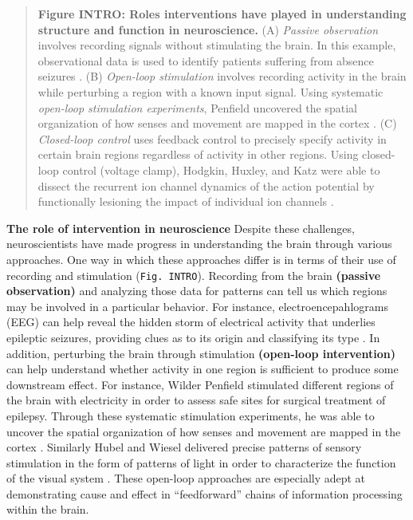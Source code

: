 \documentclass{article}
\begin{document}
\begin{quote}
\textbf{Figure INTRO: Roles interventions have played in understanding structure and function in neuroscience.} (A) \emph{Passive observation}
involves recording signals without stimulating the brain. In this example, observational data is used to identify patients suffering from absence seizures \autocite{smith2005eeg}. (B) \emph{Open-loop stimulation} involves recording activity in the brain while perturbing a region with a known input signal. Using systematic \emph{open-loop stimulation experiments}, Penfield uncovered the spatial organization of how senses and movement are mapped in the cortex
\autocite{penfield1937somatic,penfield1950cerebral}. (C)
\emph{Closed-loop control} uses feedback control to precisely specify activity in certain brain regions regardless of activity in other regions. Using closed-loop control (voltage clamp), Hodgkin, Huxley, and Katz were able to dissect the recurrent ion channel dynamics of the action potential by functionally lesioning the impact of individual ion channels
\autocite{cole1949dynamic,hodgkin1949effect,hodgkin1952measurement}.
\end{quote}

\textbf{The role of intervention in neuroscience} Despite these challenges, neuroscientists have made progress in understanding the brain through various approaches. One way in which these approaches differ is in terms of their use of recording and stimulation
(\texttt{Fig.\ INTRO}). Recording from the brain \textbf{(passive observation)} and analyzing those data for patterns can tell us which regions may be involved in a particular behavior. For instance, electroencepahlograms (EEG) can help reveal the hidden storm of electrical activity that underlies epileptic seizures, providing clues as to its origin and classifying its type \autocite{smith2005eeg}. In addition, perturbing the brain through stimulation \textbf{(open-loop intervention)} can help understand whether activity in one region is sufficient to produce some downstream effect. For instance, Wilder Penfield stimulated different regions of the brain with electricity in order to assess safe sites for surgical treatment of epilepsy. Through these systematic stimulation experiments, he was able to uncover the spatial organization of how senses and movement are mapped in the cortex
\autocite{penfield1937somatic,penfield1950cerebral}. Similarly Hubel and Wiesel delivered precise patterns of sensory stimulation in the form of patterns of light in order to characterize the function of the visual system \autocite{hubel1959receptive,hubel1962receptive}. These open-loop approaches are especially adept at demonstrating cause and effect in
``feedforward'' chains of information processing within the brain.
\end{document}
